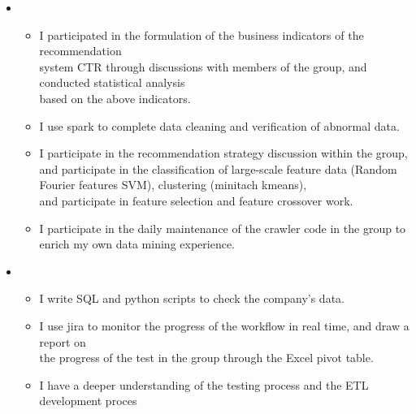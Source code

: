  \begin{itemize}[leftmargin=*]   
        \item
           {\small
      \begin{itemize}
      \item I participated in the formulation of the business indicators of the recommendation \\ system CTR through discussions with members of the group, and conducted statistical analysis \\based on the above indicators.
         \item I use spark to complete data cleaning and verification of abnormal data.
          \item I participate in the recommendation strategy discussion within the group, and participate in the classification of large-scale feature data (Random Fourier features SVM), clustering (minitach kmeans), \\ and participate in feature selection and feature crossover work.
           \item I participate in the daily maintenance of the crawler code in the group to enrich my own data mining experience.

            \end{itemize}

             }
     \item
        {\small
      \begin{itemize}
      \item I write SQL and python scripts to check the company's data.
        \item I use jira to monitor the progress of the workflow in real time, and draw a report on \\the progress of  the test in the group through the Excel pivot table.
         \item I have a deeper understanding of the testing process and the ETL development proces
         
       \end{itemize}
       }
             
  \end{itemize}
\newpage
{}
